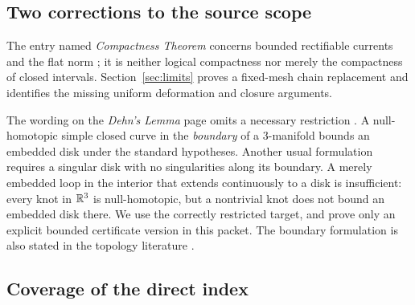 \subsection{Two corrections to the source scope}

The entry named \emph{Compactness Theorem} concerns bounded rectifiable currents and the flat norm \cite{MWCurrents}; it is neither logical compactness nor merely the compactness of closed intervals. Section~\ref{sec:limits} proves a fixed-mesh chain replacement and identifies the missing uniform deformation and closure arguments.

The wording on the \emph{Dehn's Lemma} page omits a necessary restriction \cite{MWDehn}. A null-homotopic simple closed curve in the \emph{boundary} of a 3-manifold bounds an embedded disk under the standard hypotheses. Another usual formulation requires a singular disk with no singularities along its boundary. A merely embedded loop in the interior that extends continuously to a disk is insufficient: every knot in $\mathbb R^3$ is null-homotopic, but a nontrivial knot does not bound an embedded disk there. We use the correctly restricted target, and prove only an explicit bounded certificate version in this packet. The boundary formulation is also stated in the topology literature \cite{DehnPrimary}.

\subsection{Coverage of the direct index}

